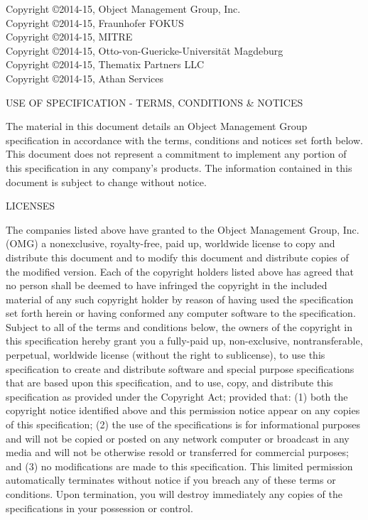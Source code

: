 \documentclass[10pt,fleqn,final]{scrreprt}
\newcommand{\OMGparagraph}[1]{
\vspace{3pt}
{\centerline {#1}}
\vspace{3pt}
}
\begin{document}
\thispagestyle{empty}
\clearpage



\noindent Copyright \copyright 2014-15, Object Management Group, Inc.\\
Copyright \copyright 2014-15, Fraunhofer FOKUS\\
Copyright \copyright 2014-15, MITRE\\
Copyright \copyright 2014-15, Otto-von-Guericke-Universit{\"a}t Magdeburg  \\
Copyright \copyright 2014-15, Thematix Partners LLC \\
Copyright \copyright 2014-15, Athan Services \\




\OMGparagraph{USE OF SPECIFICATION - TERMS, CONDITIONS \& NOTICES}
The material in this document details an Object Management Group specification
 in accordance with the terms, conditions and notices set forth below. This
  document does not represent a commitment to implement any portion of this
   specification in any company's products. The information contained in this
   document is subject to change without notice.

\OMGparagraph{LICENSES}
The companies listed above have granted to the Object Management Group, Inc.
 (OMG) a nonexclusive, royalty-free, paid up, worldwide license to copy and
 distribute this document and to modify this document and distribute copies of
  the modified version. Each of the copyright holders listed above has agreed
that no person shall be deemed to have infringed the copyright in the
included material of any such copyright holder by reason of having used the
specification set forth herein or having conformed any computer software to the
 specification.
Subject to all of the terms and conditions below, the owners of the copyright  in this
specification hereby grant you a fully-paid up, non-exclusive, nontransferable, perpetual,
worldwide license (without the right to
sublicense), to use this specification to create and distribute software and special 
purpose specifications that are based upon this specification, and to use, copy, and distribute 
this specification as provided under the Copyright Act; provided that: (1) both the copyright
notice identified above and this permission notice appear on any copies of this specification; (2)
the use of the specifications is  for informational purposes and will not be copied or
posted on any network computer or broadcast in any media and will not be 
otherwise resold or transferred for commercial purposes; and (3) no modifications are made to this
specification. This limited permission automatically terminates without notice if you breach any of
these terms or conditions. Upon termination, you will destroy immediately any copies of the
specifications in your possession or control. 
\end{document}

